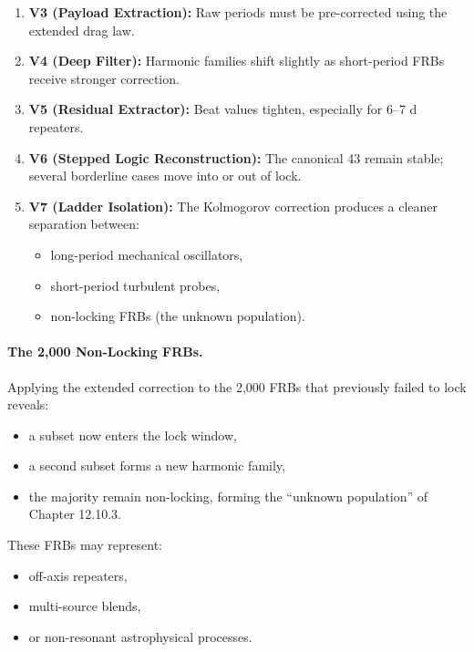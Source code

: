 \documentclass[11pt, letterpaper, openany]{book}
\begin{document}
\begin{enumerate}
    \item \textbf{V3 (Payload Extraction):}  
    Raw periods must be pre-corrected using the extended drag law.

    \item \textbf{V4 (Deep Filter):}  
    Harmonic families shift slightly as short-period FRBs receive stronger correction.

    \item \textbf{V5 (Residual Extractor):}  
    Beat values tighten, especially for 6--7 d repeaters.

    \item \textbf{V6 (Stepped Logic Reconstruction):}  
    The canonical 43 remain stable; several borderline cases move into or out of lock.

    \item \textbf{V7 (Ladder Isolation):}  
    The Kolmogorov correction produces a cleaner separation between:
    \begin{itemize}
        \item long-period mechanical oscillators,
        \item short-period turbulent probes,
        \item non-locking FRBs (the unknown population).
    \end{itemize}
\end{enumerate}

\paragraph{The 2,000 Non-Locking FRBs.}

Applying the extended correction to the 2,000 FRBs that previously failed to lock reveals:

\begin{itemize}
    \item a subset now enters the lock window,
    \item a second subset forms a new harmonic family,
    \item the majority remain non-locking, forming the ``unknown population'' of Chapter 12.10.3.
\end{itemize}

These FRBs may represent:
\begin{itemize}
    \item off-axis repeaters,
    \item multi-source blends,
    \item or non-resonant astrophysical processes.
\end{itemize}
\end{document}
